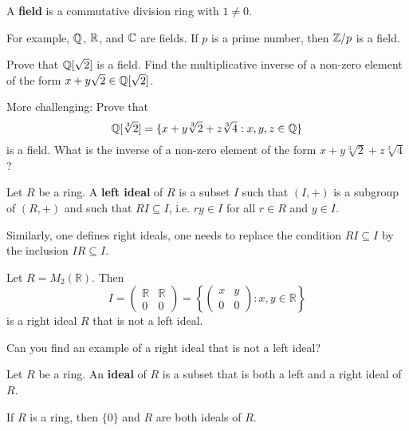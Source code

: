 \begin{definition}
	A \textbf{field} is a commutative division ring with $1\ne 0$. 
\end{definition}

For example, $\mathbb{Q}$, $\mathbb{R}$, and $\mathbb{C}$ are fields. 
If $p$ is a prime number, then $\mathbb{Z}/p$ is a field. 	

\begin{exercise}
	Prove that $\mathbb{Q}[\sqrt{2}]$ is a field. 
	Find the multiplicative inverse of a non-zero element of the form 
	$x+y\sqrt{2}\in\mathbb{Q}[\sqrt{2}]$.  
\end{exercise}

More challenging: Prove that 
\[
\mathbb{Q}[\sqrt[3]{2}]=\{x+y\sqrt[3]{2}+z\sqrt[3]{4}:x,y,z\in\mathbb{Q}\}
\]
is a field. What is the inverse of a non-zero element of the form $x+y\sqrt[3]{2}+z\sqrt[3]{4}$?


\begin{definition}
	Let $R$ be a ring. A \textbf{left ideal} of $R$ is a subset $I$ such that 
	$(I,+)$ is a subgroup of $(R,+)$ and such that $RI\subseteq I$, 
	i.e. $ry\in I$ for all $r\in R$ and $y\in I$. 
\end{definition}

Similarly, one defines right ideals, one needs 
to replace the condition $RI\subseteq I$ by 
the inclusion 
$IR\subseteq I$. 

\begin{example}
Let $R=M_{2}(\mathbb{R})$. Then   
\[
I=\left(\begin{array}{cc}
\mathbb{R} & \mathbb{R}\\
0 & 0
\end{array}\right)=\left\{ \left(\begin{array}{cc}
x & y\\
0 & 0
\end{array}\right):x,y\in\mathbb{R}\right\} 
\]
is a right ideal $R$ that is not a left ideal. 
\end{example}

Can you find an 
example of a right ideal that is not a left ideal?

\begin{definition}
Let $R$ be a ring. An \textbf{ideal} of $R$ 
is a subset that is both a left and a right ideal of $R$. 
\end{definition}
 
If $R$ is a ring, then $\{0\}$ and $R$ are both ideals of $R$. 

